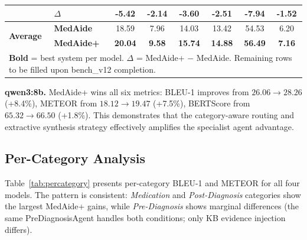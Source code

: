 \documentclass[conference]{IEEEtran}
\begin{document}
\begin{table}[t]
\begin{tabular}{llcccccc}
  & $\Delta$  & \textcolor{lossred}{-5.42} & \textcolor{lossred}{-2.14} & \textcolor{lossred}{-3.60} & \textcolor{lossred}{-2.51} & \textcolor{lossred}{-7.94} & \textcolor{lossred}{-1.52} \\
\midrule
\multirow{2}{*}{\textbf{Average}}
  & \textbf{MedAide}   & 18.59 & 7.96 & 14.03 & 13.42 & 54.53 & 6.20 \\
  & \textbf{MedAide+}  & \textbf{20.04} & \textbf{9.58} & \textbf{15.74} & \textbf{14.88} & \textbf{56.49} & \textbf{7.16} \\
\bottomrule
\multicolumn{8}{l}{\scriptsize \textbf{Bold} = best system per model. $\Delta$ = MedAide+ $-$ MedAide. Remaining rows to be filled upon bench\_v12 completion.}\\
\end{tabular}
\end{table}

\noindent\textbf{qwen3:8b.} MedAide+ wins all six metrics: BLEU-1 improves from
$26.06 \rightarrow 28.26$ (+8.4\%), METEOR from $18.12 \rightarrow 19.47$ (+7.5\%),
BERTScore from $65.32 \rightarrow 66.50$ (+1.8\%). This demonstrates that the
category-aware routing and extractive synthesis strategy effectively amplifies the
specialist agent advantage.

\subsection{Per-Category Analysis}
\label{sec:percategory}

Table~\ref{tab:percategory} presents per-category BLEU-1 and METEOR for all four
models. The pattern is consistent: \emph{Medication} and \emph{Post-Diagnosis}
categories show the largest MedAide+ gains, while \emph{Pre-Diagnosis} shows marginal
differences (the same PreDiagnosisAgent handles both conditions; only KB evidence
injection differs).
\end{document}
